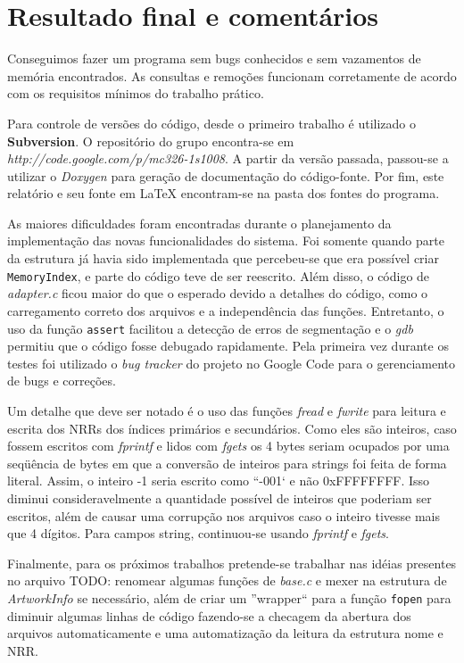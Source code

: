 \documentclass[a4paper,10pt]{article}
\begin{document}
\section{Resultado final e comentários}
Conseguimos fazer um programa sem bugs conhecidos e sem vazamentos de memória encontrados. As consultas e remoções funcionam corretamente de acordo com os requisitos mínimos do trabalho prático.

Para controle de versões do código, desde o primeiro trabalho é utilizado o \textbf{Subversion}. O repositório do grupo encontra-se em \textit{http://code.google.com/p/mc326-1s1008}. A partir da versão passada, passou-se a utilizar o \textit{Doxygen} para geração de documentação do código-fonte. Por fim, este relatório e seu fonte em LaTeX encontram-se na pasta dos fontes do programa.

As maiores dificuldades foram encontradas durante o planejamento da implementação das novas funcionalidades do sistema. Foi somente quando parte da estrutura já havia sido implementada que percebeu-se que era possível criar \texttt{MemoryIndex}, e parte do código teve de ser reescrito. Além disso, o código de \textit{adapter.c} ficou maior do que o esperado devido a detalhes do código, como o carregamento correto dos arquivos e a independência das funções. Entretanto, o uso da função \texttt{assert} facilitou a detecção de erros de segmentação e o \textit{gdb} permitiu que o código fosse debugado rapidamente. Pela primeira vez durante os testes foi utilizado o \textit{bug tracker} do projeto no Google Code para o gerenciamento de bugs e correções.

Um detalhe que deve ser notado é o uso das funções \textit{fread} e \textit{fwrite} para leitura e escrita dos NRRs dos índices primários e secundários. Como eles são inteiros, caso fossem escritos com \textit{fprintf} e lidos com \textit{fgets} os 4 bytes seriam ocupados por uma seqüência de bytes em que a conversão de inteiros para strings foi feita de forma literal. Assim, o inteiro -1 seria escrito como ``-001` e não 0xFFFFFFFF. Isso diminui consideravelmente a quantidade possível de inteiros que poderiam ser escritos, além de causar uma corrupção nos arquivos caso o inteiro tivesse mais que 4 dígitos. Para campos string, continuou-se usando \textit{fprintf} e \textit{fgets}.

Finalmente, para os próximos trabalhos pretende-se trabalhar nas idéias presentes no arquivo TODO: renomear algumas funções de \textit{base.c} e mexer na estrutura de \textit{ArtworkInfo} se necessário, além de criar um ''wrapper`` para a função \texttt{fopen} para diminuir algumas linhas de código fazendo-se a checagem da abertura dos arquivos automaticamente e uma automatização da leitura da estrutura nome e NRR.
\end{document}
